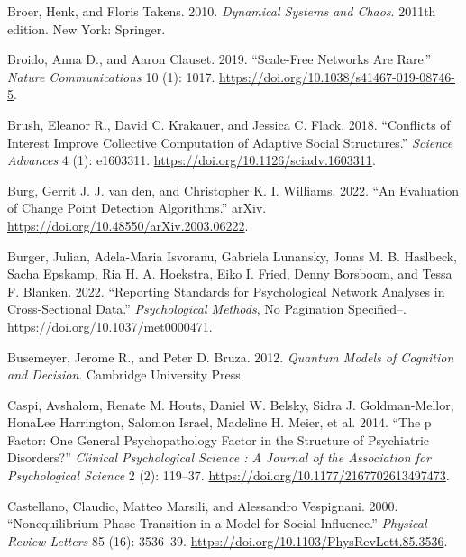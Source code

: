 \documentclass[
  a4paper,
  DIV=11,
  numbers=noendperiod,
  oneside]{scrreprt}
\newlength{\cslhangindent}
\newlength{\cslentryspacingunit} %
\newenvironment{CSLReferences}[2] %
 {%
  \setlength{\parindent}{0pt}
  \ifodd #1
  \let\oldpar\par
  \def\par{\hangindent=\cslhangindent\oldpar}
  \fi
  \setlength{\parskip}{#2\cslentryspacingunit}
 }%
 {}
\begin{document}
\begin{CSLReferences}{1}{0}
\leavevmode{}%
Broer, Henk, and Floris Takens. 2010. \emph{Dynamical Systems and
Chaos}. 2011th edition. New York: Springer.

\leavevmode{}%
Broido, Anna D., and Aaron Clauset. 2019. {``Scale-Free Networks Are
Rare.''} \emph{Nature Communications} 10 (1): 1017.
\url{https://doi.org/10.1038/s41467-019-08746-5}.

\leavevmode{}%
Brush, Eleanor R., David C. Krakauer, and Jessica C. Flack. 2018.
{``Conflicts of Interest Improve Collective Computation of Adaptive
Social Structures.''} \emph{Science Advances} 4 (1): e1603311.
\url{https://doi.org/10.1126/sciadv.1603311}.

\leavevmode{}%
Burg, Gerrit J. J. van den, and Christopher K. I. Williams. 2022. {``An
{Evaluation} of {Change Point Detection Algorithms}.''} {arXiv}.
\url{https://doi.org/10.48550/arXiv.2003.06222}.

\leavevmode{}%
Burger, Julian, Adela-Maria Isvoranu, Gabriela Lunansky, Jonas M. B.
Haslbeck, Sacha Epskamp, Ria H. A. Hoekstra, Eiko I. Fried, Denny
Borsboom, and Tessa F. Blanken. 2022. {``Reporting Standards for
Psychological Network Analyses in Cross-Sectional Data.''}
\emph{Psychological Methods}, No Pagination Specified--.
\url{https://doi.org/10.1037/met0000471}.

\leavevmode{}%
Busemeyer, Jerome R., and Peter D. Bruza. 2012. \emph{Quantum {Models}
of {Cognition} and {Decision}}. {Cambridge University Press}.

\leavevmode{}%
Caspi, Avshalom, Renate M. Houts, Daniel W. Belsky, Sidra J.
Goldman-Mellor, HonaLee Harrington, Salomon Israel, Madeline H. Meier,
et al. 2014. {``The p {Factor}: {One General Psychopathology Factor} in
the {Structure} of {Psychiatric Disorders}?''} \emph{Clinical
Psychological Science : A Journal of the Association for Psychological
Science} 2 (2): 119--37. \url{https://doi.org/10.1177/2167702613497473}.

\leavevmode{}%
Castellano, Claudio, Matteo Marsili, and Alessandro Vespignani. 2000.
{``Nonequilibrium {Phase Transition} in a {Model} for {Social
Influence}.''} \emph{Physical Review Letters} 85 (16): 3536--39.
\url{https://doi.org/10.1103/PhysRevLett.85.3536}.


\end{CSLReferences}
\end{document}
